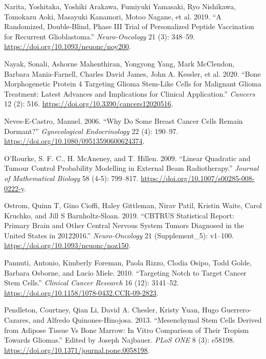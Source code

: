 \documentclass[
  letterpaper,
]{scrreprt}
\newlength{\cslhangindent}
\newenvironment{CSLReferences}[2] %
 {\begin{list}{}{%
  \setlength{\itemindent}{0pt}
  \setlength{\leftmargin}{0pt}
  \setlength{\parsep}{0pt}
  \ifodd #1
   \setlength{\leftmargin}{\cslhangindent}
   \setlength{\itemindent}{-1\cslhangindent}
  \fi
  \setlength{\itemsep}{#2\baselineskip}}}
 {\end{list}}
\theoremstyle{definition}
\theoremstyle{remark}
\begin{document}
\begin{CSLReferences}{1}{0}
Narita, Yoshitaka, Yoshiki Arakawa, Fumiyuki Yamasaki, Ryo Nishikawa,
Tomokazu Aoki, Masayuki Kanamori, Motoo Nagane, et al. 2019. {``A
Randomized, Double-Blind, Phase III Trial of Personalized Peptide
Vaccination for Recurrent Glioblastoma.''} \emph{Neuro-Oncology} 21 (3):
348--59. \url{https://doi.org/10.1093/neuonc/noy200}.

Nayak, Sonali, Ashorne Mahenthiran, Yongyong Yang, Mark McClendon,
Barbara Mania-Farnell, Charles David James, John A. Kessler, et al.
2020. {``Bone Morphogenetic Protein 4 Targeting Glioma Stem-Like Cells
for Malignant Glioma Treatment: Latest Advances and Implications for
Clinical Application.''} \emph{Cancers} 12 (2): 516.
\url{https://doi.org/10.3390/cancers12020516}.

Neves-E-Castro, Manuel. 2006. {``Why Do Some Breast Cancer Cells Remain
Dormant?''} \emph{Gynecological Endocrinology} 22 (4): 190--97.
\url{https://doi.org/10.1080/09513590600624374}.

O'Rourke, S. F. C., H. McAneney, and T. Hillen. 2009. {``Linear
Quadratic and Tumour Control Probability Modelling in External Beam
Radiotherapy.''} \emph{Journal of Mathematical Biology} 58 (4-5):
799--817. \url{https://doi.org/10.1007/s00285-008-0222-y}.

Ostrom, Quinn T, Gino Cioffi, Haley Gittleman, Nirav Patil, Kristin
Waite, Carol Kruchko, and Jill S Barnholtz-Sloan. 2019. {``CBTRUS
Statistical Report: Primary Brain and Other Central Nervous System
Tumors Diagnosed in the United States in 2012{\textendash}2016.''}
\emph{Neuro-Oncology} 21 (Supplement{\_}5): v1--100.
\url{https://doi.org/10.1093/neuonc/noz150}.

Pannuti, Antonio, Kimberly Foreman, Paola Rizzo, Clodia Osipo, Todd
Golde, Barbara Osborne, and Lucio Miele. 2010. {``Targeting Notch to
Target Cancer Stem Cells.''} \emph{Clinical Cancer Research} 16 (12):
3141--52. \url{https://doi.org/10.1158/1078-0432.CCR-09-2823}.

Pendleton, Courtney, Qian Li, David A. Chesler, Kristy Yuan, Hugo
Guerrero-Cazares, and Alfredo Quinones-Hinojosa. 2013. {``Mesenchymal
Stem Cells Derived from Adipose Tissue Vs Bone Marrow: In Vitro
Comparison of Their Tropism Towards Gliomas.''} Edited by Joseph
Najbauer. \emph{PLoS ONE} 8 (3): e58198.
\url{https://doi.org/10.1371/journal.pone.0058198}.


\end{CSLReferences}
\end{document}

